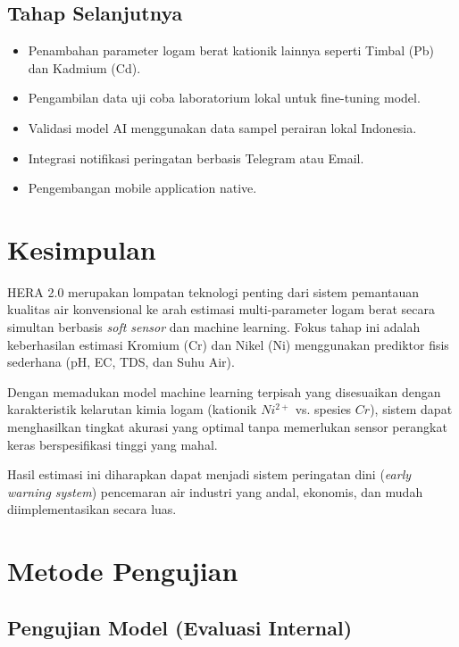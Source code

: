 \documentclass[12pt,a4paper]{article}
\begin{document}
\subsection{Tahap Selanjutnya}
\begin{itemize}
    \item Penambahan parameter logam berat kationik lainnya seperti Timbal (Pb) dan Kadmium (Cd).
    \item Pengambilan data uji coba laboratorium lokal untuk fine-tuning model.
    \item Validasi model AI menggunakan data sampel perairan lokal Indonesia.
    \item Integrasi notifikasi peringatan berbasis Telegram atau Email.
    \item Pengembangan mobile application native.
\end{itemize}


\section{Kesimpulan}

HERA 2.0 merupakan lompatan teknologi penting dari sistem pemantauan kualitas air konvensional ke arah estimasi multi-parameter logam berat secara simultan berbasis \textit{soft sensor} dan machine learning. Fokus tahap ini adalah keberhasilan estimasi Kromium (Cr) dan Nikel (Ni) menggunakan prediktor fisis sederhana (pH, EC, TDS, dan Suhu Air).

Dengan memadukan model machine learning terpisah yang disesuaikan dengan karakteristik kelarutan kimia logam (kationik $Ni^{2+}$ vs. spesies $Cr$), sistem dapat menghasilkan tingkat akurasi yang optimal tanpa memerlukan sensor perangkat keras berspesifikasi tinggi yang mahal.

Hasil estimasi ini diharapkan dapat menjadi sistem peringatan dini (\textit{early warning system}) pencemaran air industri yang andal, ekonomis, dan mudah diimplementasikan secara luas.
\section{Metode Pengujian}

\subsection{Pengujian Model (Evaluasi Internal)}
\end{document}
